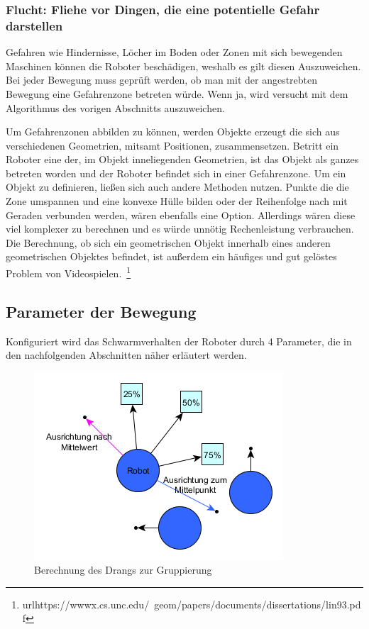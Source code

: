 \subsubsection*{Flucht: Fliehe vor Dingen, die eine potentielle Gefahr darstellen}

Gefahren wie Hindernisse, Löcher im Boden oder Zonen mit sich bewegenden Maschinen können die Roboter beschädigen, weshalb es gilt diesen Auszuweichen. Bei jeder Bewegung muss geprüft werden, ob man mit der angestrebten Bewegung eine Gefahrenzone betreten würde. Wenn ja, wird versucht mit dem Algorithmus des vorigen Abschnitts auszuweichen.

Um Gefahrenzonen abbilden zu können, werden Objekte erzeugt die sich aus verschiedenen Geometrien, mitsamt Positionen, zusammensetzen. Betritt ein Roboter eine der, im Objekt inneliegenden Geometrien, ist das Objekt als ganzes betreten worden und der Roboter befindet sich in einer Gefahrenzone.
Um ein Objekt zu definieren, ließen sich auch andere Methoden nutzen. Punkte die die Zone umspannen und eine konvexe Hülle bilden oder der Reihenfolge nach mit Geraden verbunden werden, wären ebenfalls eine Option. Allerdings wären diese viel komplexer zu berechnen und es würde unnötig Rechenleistung verbrauchen.
Die Berechnung, ob sich ein geometrischen Objekt innerhalb eines anderen geometrischen Objektes befindet, ist außerdem ein häufiges und gut gelöstes Problem von Videospielen.~\footnote{url{https://wwwx.cs.unc.edu/~geom/papers/documents/dissertations/lin93.pdf}}

\subsection*{Parameter der Bewegung}

Konfiguriert wird das Schwarmverhalten der Roboter durch 4 Parameter, die in den nachfolgenden Abschnitten näher erläutert werden.

\begin{figure}
	\includegraphics[width=\pictureWidth,keepaspectratio]{graphics/BerechnungDrangZurGruppe.png}
	\caption{Berechnung des Drangs zur Gruppierung}
	\label{pic:BerechnungDrangZurGruppe}
\end{figure}

